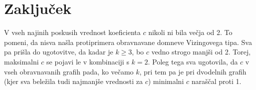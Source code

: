 \documentclass[12pt, a4paper]{article}
\begin{document}
\section{Zaključek}
V vseh najinih poskusih vrednost koeficienta $c$ nikoli ni bila večja od 2. To pomeni, da nisva našla protiprimera obravnavane domneve Vizingovega tipa. Sva pa prišla do ugotovitve, da kadar je $k \geq 3$, bo $c$ vedno strogo manjši od 2. Torej, maksimalni $c$ se pojavi le v kombinaciji s $k=2$. Poleg tega sva ugotovila, da $c$ v vseh obravnavanih grafih pada, ko večamo $k$, pri tem pa je pri dvodelnih grafih (kjer sva beležila tudi najmanjše vrednosti za $c$) minimalni $c$ naraščal proti 1.
\end{document}
